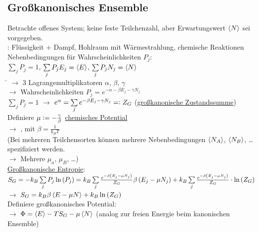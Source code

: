\subsection{Großkanonisches Ensemble}
\begin{tabbing}
Betrachte offenes System; keine feste Teilchenzahl, aber Erwartungswert $\left\langle N \right\rangle$ sei vorgegeben.\\
: Flüssigkeit $+$ Dampf, Hohlraum mit Wärmestrahlung, chemische Reaktionen\\
Nebenbedingungen für Wahrscheinlichkeiten $P_j$:\\
$\sum\limits_j P_j = 1$, $\sum\limits_j P_j E_j = \left\langle E \right\rangle$, $\sum\limits_j P_j N_j = \left\langle N \right\rangle$\\
\hspace{4em} \= \kill
$\rightarrow$\> $3$ Lagrangemultiplikatoren $\alpha$, $\beta$, $\gamma$\\
$\rightarrow$\> Wahrscheinlichkeiten $P_j = e^{-\alpha-\beta E_j - \gamma N_j}$\\
$\sum\limits_j P_j = 1$ $\rightarrow$ $e^{\alpha} = \sum\limits_j e^{-\beta E_j - \gamma N_j} = \vcentcolon Z_G$ (\uline{großkanonische Zustandssumme})\\
Definiere $\mu \vcentcolon = - \frac{\gamma}{\beta}$ \uline{chemisches Potential}\\
$\rightarrow$\> ,  mit $\beta = \frac{1}{k_BT}$\\
(Bei mehreren Teilchensorten können mehrere Nebenbedingungen $\left\langle N_A \right\rangle$, $\left\langle N_B \right\rangle$, \dots spezifiziert werden.\\
$\rightarrow$ Mehrere $\mu_a$, $\mu_B$, \dots)\\
\uline{Großkanonische Entropie}:\\
\> $S_G = -k_B \sum\limits_j P_j \ln\left( P_j \right) = k_B \sum\limits_j \frac{e^{-\beta\left( E_j - \mu N_j \right)}}{Z_G} \beta \left( E_j - \mu N_j \right) + k_B \sum\limits_j \frac{e^{-\beta\left( E_j - \mu N_j \right)}}{Z_G} \cdot \ln\left( Z_G \right)$\\
$\rightarrow$\> $S_G = k_B \beta \left\langle E-\mu N \right\rangle + k_B \ln\left( Z_G \right)$\\
Definiere großkanonisches Potential: \\
$\rightarrow$\> $\Phi = \left\langle E \right\rangle - T S_G - \mu \left\langle N \right\rangle$ (analog zur freien Energie beim kanonischen Ensemble)
\end{tabbing}
